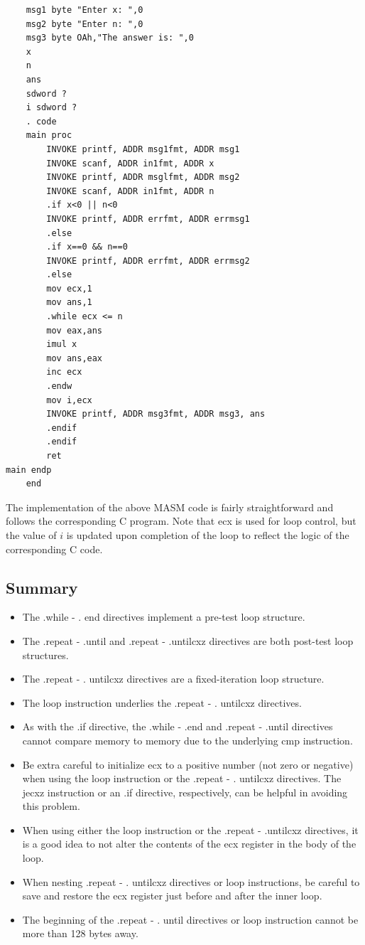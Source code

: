 \documentclass[10pt]{book}
\begin{document}
\begin{verbatim}
    msg1 byte "Enter x: ",0
    msg2 byte "Enter n: ",0
    msg3 byte OAh,"The answer is: ",0
    x
    n
    ans
    sdword ?
    i sdword ?
    . code
    main proc
        INVOKE printf, ADDR msg1fmt, ADDR msg1
        INVOKE scanf, ADDR in1fmt, ADDR x
        INVOKE printf, ADDR msglfmt, ADDR msg2
        INVOKE scanf, ADDR in1fmt, ADDR n
        .if x<0 || n<0
        INVOKE printf, ADDR errfmt, ADDR errmsg1
        .else
        .if x==0 && n==0
        INVOKE printf, ADDR errfmt, ADDR errmsg2
        .else
        mov ecx,1
        mov ans,1
        .while ecx <= n
        mov eax,ans
        imul x
        mov ans,eax
        inc ecx
        .endw
        mov i,ecx
        INVOKE printf, ADDR msg3fmt, ADDR msg3, ans
        .endif
        .endif
        ret
main endp
    end
\end{verbatim}

The implementation of the above MASM code is fairly straightforward and follows the corresponding C program. Note that ecx is used for loop control, but the value of $i$ is updated upon completion of the loop to reflect the logic of the corresponding C code.

\subsection{Summary}
\begin{itemize}
  \item The .while - . end directives implement a pre-test loop structure.
  \item The .repeat - .until and .repeat - .untilcxz directives are both post-test loop structures.
  \item The .repeat - . untilcxz directives are a fixed-iteration loop structure.
  \item The loop instruction underlies the .repeat - . untilcxz directives.
  \item As with the .if directive, the .while - .end and .repeat - .until directives cannot compare memory to memory due to the underlying cmp instruction.
  \item Be extra careful to initialize ecx to a positive number (not zero or negative) when using the loop instruction or the .repeat - . untilcxz directives. The jecxz instruction or an .if directive, respectively, can be helpful in avoiding this problem.
  \item When using either the loop instruction or the .repeat - .untilcxz directives, it is a good idea to not alter the contents of the ecx register in the body of the loop.
  \item When nesting .repeat - . untilcxz directives or loop instructions, be careful to save and restore the ecx register just before and after the inner loop.
  \item The beginning of the .repeat - . until directives or loop instruction cannot be more than 128 bytes away.
\end{itemize}
\end{document}
